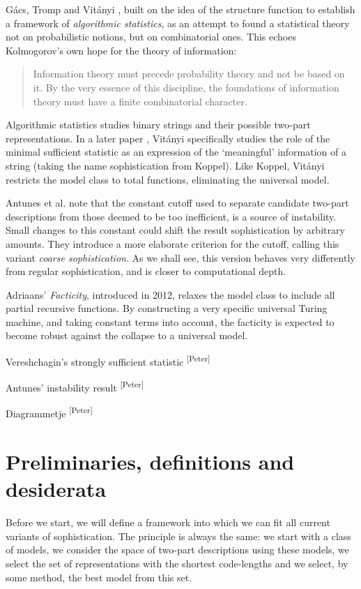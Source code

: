 \documentclass{style/llncs}
\newcommand{\pb}[1]{\textcolor{OliveGreen}{\small #1 \textsuperscript{[Peter]} }}
\begin{document}
G\'acs, Tromp and Vit\'anyi \cite{gacs2001algorithmic}, built on the idea of the structure function to establish a framework of \emph{algorithmic statistics}, as an attempt to found a statistical theory not on probabilistic notions, but on combinatorial ones. This echoes Kolmogorov's own hope for the theory of information:
\begin{quotation}
\noindent Information theory must precede probability theory and not be based on it. By the very essence of this discipline, the foundations of information theory must have a finite combinatorial character. \cite{kolmogorov1983combinatorial}
\end{quotation}
Algorithmic statistics studies binary strings and their possible two-part representations. In a later paper \cite{gacs2001algorithmic}, Vit\'anyi specifically studies the role of the minimal sufficient statistic as an expression of the `meaningful' information of a string (taking the name sophistication from Koppel). Like Koppel, Vit\'anyi restricts the model class to total functions, eliminating the universal model.

Antunes et al. \cite{antunes2009sophistication} note that the constant cutoff used to separate candidate two-part descriptions from those deemed to be too inefficient, is a source of instability. Small changes to this constant could shift the result sophistication by arbitrary amounts. They introduce a more elaborate criterion for the cutoff, calling this variant \emph{coarse sophistication}. As we shall see, this version behaves very differently from regular sophistication, and is closer to computational depth.
 
Adriaans' \emph{Facticity}, introduced in 2012\cite{adriaans2012facticity}, relaxes the model class to include all partial recursive functions. By constructing a very specific universal Turing machine, and taking constant terms into account, the facticity is expected to become robust against the collapse to a universal model.

\pb{Vereshchagin's strongly sufficient statistic} 

\pb{Antunes' instability result}

\pb{Diagrammetje}

\section{Preliminaries, definitions and desiderata}

Before we start, we will define a framework into which we can fit all current variants of sophistication. The principle is always the same: we start with a class of models, we consider the space of two-part descriptions using these models, we select the set of representations with the shortest code-lengths and we select, by some method, the best model from this set. 
\end{document}
